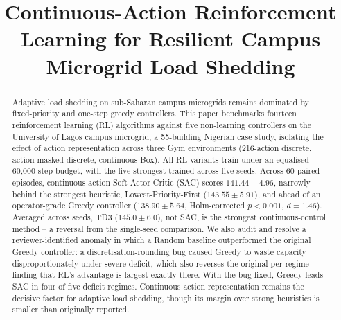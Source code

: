 \documentclass[9pt,conference]{IEEEtran}
\begin{document}
\title{\fontsize{24}{28}\selectfont\normalfont Continuous-Action Reinforcement Learning for Resilient Campus Microgrid Load Shedding}

\author{
\and
{}
\and
{}
}

\maketitle
\thispagestyle{firstpage}

\begin{abstract}
Adaptive load shedding on sub-Saharan campus microgrids remains dominated by fixed-priority and one-step greedy controllers. This paper benchmarks fourteen reinforcement learning (RL) algorithms against five non-learning controllers on the University of Lagos campus microgrid, a 55-building Nigerian case study, isolating the effect of action representation across three Gym environments (216-action discrete, action-masked discrete, continuous Box). All RL variants train under an equalised 60{,}000-step budget, with the five strongest trained across five seeds. Across 60 paired episodes, continuous-action Soft Actor-Critic (SAC) scores $141.44 \pm 4.96$, narrowly behind the strongest heuristic, Lowest-Priority-First ($143.55 \pm 5.91$), and ahead of an operator-grade Greedy controller ($138.90 \pm 5.64$, Holm-corrected $p<0.001$, $d=1.46$). Averaged across seeds, TD3 ($145.0 \pm 6.0$), not SAC, is the strongest continuous-control method -- a reversal from the single-seed comparison. We also audit and resolve a reviewer-identified anomaly in which a Random baseline outperformed the original Greedy controller: a discretisation-rounding bug caused Greedy to waste capacity disproportionately under severe deficit, which also reverses the original per-regime finding that RL's advantage is largest exactly there. With the bug fixed, Greedy leads SAC in four of five deficit regimes. Continuous action representation remains the decisive factor for adaptive load shedding, though its margin over strong heuristics is smaller than originally reported.
\end{abstract}
\end{document}
